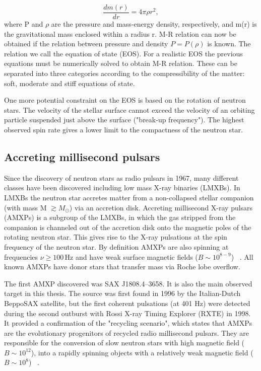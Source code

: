 \documentclass{wihuri}
\begin{document}
\begin{equation}
 \frac{dm(r)}{dr} = 4 \pi \rho r^{2},
 \end{equation}
where P and $\rho$ are the pressure and mass-energy density, respectively, and m(r) is the gravitational mass enclosed within a radius r. M-R relation can now be obtained if the relation between pressure and density $P=P(\rho)$ is known. The relation we call the equation of state (EOS). For a realistic EOS the previous equations must be numerically solved to obtain M-R relation. These can be separated into three categories according to the compressibility of the matter: soft, moderate and stiff equations of state.




One more potential constraint on the EOS is based on the rotation of neutron stars. The velocity of the stellar surface cannot exceed the velocity of an orbiting particle suspended just above the surface ("break-up frequency"). The highest observed spin rate gives a lower limit to the compactness of the neutron star.


\subsection{Accreting millisecond pulsars}




Since the discovery of neutron stars as radio pulsars
in 1967, many different classes have been discovered including low mass X-ray binaries (LMXBs). In LMXBs the neutron star accretes matter from a non-collapsed stellar companion (with mass M $\gtrsim  M_{\odot}$) via an accretion disk. Accreting millisecond X-ray pulsars (AMXPs) is a subgroup of the LMXBs, in which the gas stripped from the companion is channeled out of the accretion disk onto the magnetic poles of the rotating neutron star. This gives rise to the X-ray pulsations at the spin frequency of the neutron star. By definition AMXPs are also spinning at frequencies $\nu \ge 100 \, \mathrm{Hz}$ and have weak surface magnetic fields ($B \sim 10^{8-9}$) ~\cite{patruno}. All known AMXPs have donor stars that transfer mass via Roche lobe overflow. 



The first AMXP discovered was SAX J1808.4–3658. It is also the main observed target in this thesis. The source was first found in 1996 by the Italian-Dutch BeppoSAX satellite, but the first coherent pulsations (at 401 Hz) were detected during the second outburst with Rossi X-ray Timing Explorer (RXTE) in 1998.  It provided a confirmation of the "recycling scenario", which states that AMXPs are the evolutionary progenitors of recycled radio millisecond pulsars. They are responsible for the conversion of slow neutron stars with high magnetic field ($B \sim 10^{12}$), into a rapidly spinning objects with a relatively weak magnetic field ($B \sim 10^{8}$) ~\cite{patruno}. 
\end{document}

